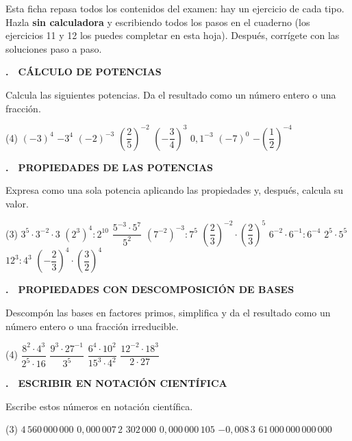 \documentclass[11pt,a4paper]{article}
\newcommand{\seccio}[2]{}
\newcounter{exer}
\newcommand{\ex}[2]{\par\needspace{5\baselineskip}\bigskip\stepcounter{exer}\noindent
  {\color{cursfosc}\bfseries\theexer.}\ \ {\scriptsize\bfseries\color{curs}\MakeUppercase{#1}}\par\nopagebreak\smallskip
  \noindent #2\par}
\begin{document}
\thispagestyle{primera}

\vspace{8pt}

\begin{tcolorbox}[colback=soft,colframe=soft,arc=2mm,left=3mm,right=3mm,top=1.5mm,bottom=1.5mm]
\small Esta ficha repasa todos los contenidos del examen: hay un ejercicio de cada tipo. Hazla \textbf{sin calculadora} y escribiendo todos los pasos en el cuaderno (los ejercicios 11 y 12 los puedes completar en esta hoja). Después, corrígete con las soluciones paso a paso.
\end{tcolorbox}

\seccio{A}{Potencias y notación científica}

\ex{Cálculo de potencias}{Calcula las siguientes potencias. Da el resultado como un número entero o una fracción.}
\begin{tasks}(4)
  \task $(-3)^{4}$
  \task $-3^{4}$
  \task $(-2)^{-3}$
  \task $\left(\dfrac25\right)^{-2}$
  \task $\left(-\dfrac34\right)^{3}$
  \task $0,1^{-3}$
  \task $(-7)^{0}$
  \task $-\left(\dfrac12\right)^{-4}$
\end{tasks}

\ex{Propiedades de las potencias}{Expresa como una sola potencia aplicando las propiedades y, después, calcula su valor.}
\begin{tasks}(3)
  \task $3^{5}\cdot3^{-2}\cdot3$
  \task $\left(2^{3}\right)^{4}:2^{10}$
  \task $\dfrac{5^{-3}\cdot5^{7}}{5^{2}}$
  \task $\left(7^{-2}\right)^{-3}:7^{5}$
  \task $\left(\dfrac23\right)^{-2}\cdot\left(\dfrac23\right)^{5}$
  \task $6^{-2}\cdot6^{-1}:6^{-4}$
  \task $2^{5}\cdot5^{5}$
  \task $12^{3}:4^{3}$
  \task $\left(-\dfrac23\right)^{4}\cdot\left(\dfrac32\right)^{4}$
\end{tasks}

\ex{Propiedades con descomposición de bases}{Descompón las bases en factores primos, simplifica y da el resultado como un número entero o una fracción irreducible.}
\begin{tasks}(4)
  \task $\dfrac{8^{2}\cdot4^{3}}{2^{5}\cdot16}$
  \task $\dfrac{9^{3}\cdot27^{-1}}{3^{5}}$
  \task $\dfrac{6^{4}\cdot10^{2}}{15^{3}\cdot4^{2}}$
  \task $\dfrac{12^{-2}\cdot18^{3}}{2\cdot27}$
\end{tasks}

\ex{Escribir en notación científica}{Escribe estos números en notación científica.}
\begin{tasks}(3)
  \task $4\,560\,000\,000$
  \task $0,000\,007\,2$
  \task $302\,000$
  \task $0,000\,000\,105$
  \task $-0,008\,3$
  \task $61\,000\,000\,000\,000$
\end{tasks}
\end{document}
